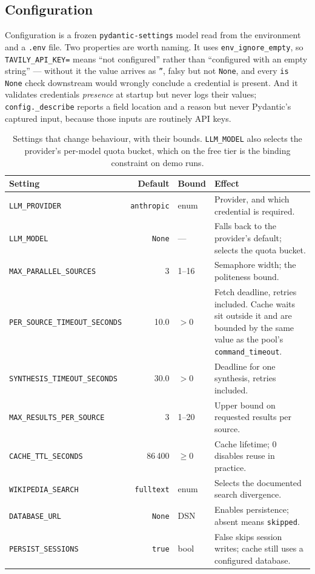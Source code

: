 \documentclass[10pt,a4paper]{article}
\begin{document}
\subsection{Configuration}

Configuration is a frozen \texttt{pydantic-settings} model read from the environment and a
\texttt{.env} file. Two properties are worth naming. It uses \texttt{env\_ignore\_empty}, so
\texttt{TAVILY\_API\_KEY=} means ``not configured'' rather than ``configured with an empty
string'' --- without it the value arrives as \texttt{''}, falsy but not \texttt{None}, and every
\texttt{is None} check downstream would wrongly conclude a credential is present. And
it validates credentials \emph{presence} at startup but never logs their values;
\texttt{config.\_describe} reports a field location and a reason but never Pydantic's captured
input, because those inputs are routinely API keys.

\begin{table}[htbp]
\centering
\footnotesize
\caption{Settings that change behaviour, with their bounds. \texttt{LLM\_MODEL} also selects the
provider's per-model quota bucket, which on the free tier is the binding constraint on demo
runs.}
\label{tab:settings}
\begin{tabularx}{\textwidth}{@{}lrlX@{}}
\toprule
\textbf{Setting} & \textbf{Default} & \textbf{Bound} & \textbf{Effect} \\
\midrule
\texttt{LLM\_PROVIDER} & \texttt{anthropic} & enum & Provider, and which credential is required. \\
\texttt{LLM\_MODEL} & \texttt{None} & --- & Falls back to the provider's default; selects the quota bucket. \\
\texttt{MAX\_PARALLEL\_SOURCES} & 3 & 1--16 & Semaphore width; the politeness bound. \\
\texttt{PER\_SOURCE\_TIMEOUT\_SECONDS} & 10.0 & $>0$ & Fetch deadline, retries included. Cache waits sit outside it and are bounded by the same value as the pool's \texttt{command\_timeout}. \\
\texttt{SYNTHESIS\_TIMEOUT\_SECONDS} & 30.0 & $>0$ & Deadline for one synthesis, retries included. \\
\texttt{MAX\_RESULTS\_PER\_SOURCE} & 3 & 1--20 & Upper bound on requested results per source. \\
\texttt{CACHE\_TTL\_SECONDS} & 86\,400 & $\geq 0$ & Cache lifetime; 0 disables reuse in practice. \\
\texttt{WIKIPEDIA\_SEARCH} & \texttt{fulltext} & enum & Selects the documented search divergence. \\
\texttt{DATABASE\_URL} & \texttt{None} & DSN & Enables persistence; absent means \texttt{skipped}. \\
\texttt{PERSIST\_SESSIONS} & \texttt{true} & bool & False skips session writes; cache still uses a configured database. \\
\bottomrule
\end{tabularx}
\end{table}
\end{document}
